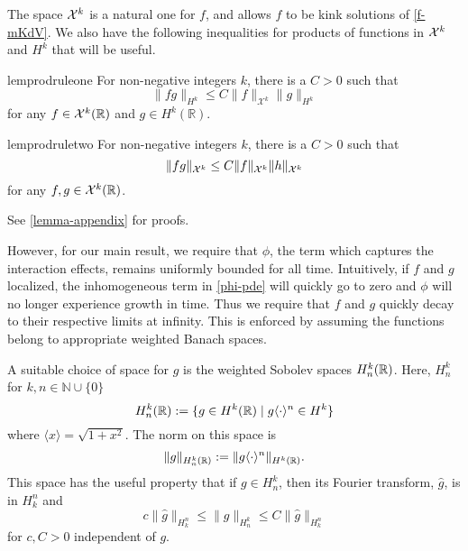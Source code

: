 The space \(\mathcal{X}^k\) is a natural one for \(f\), and allows \(f\) to be kink solutions of \cref{f-mKdV}. We also have the following inequalities for products of functions in \(\mathcal{X}^k\) and \(H^k\) that will be useful. 

	
\begin{restatable}{lem}{prodruleone}
	\label{prod-rule-1-lem}
	For non-negative integers \(k\), there is a \(C>0\) such that
	\begin{equation}\label{prod_rule}
		\| fg \|_{H^k} \leq C \| f \|_{\mathcal X^k} \| g \|_{H^k}
	\end{equation}
	for any \(f\in \mathcal{X}^k(\mathbb R)\) and \(g \in H^k(\mathbb R)\).
\end{restatable}

\begin{restatable}{lem}{prodruletwo}
	\label{prod-rule-2-lem}
	For non-negative integers \(k\), there is a \(C>0\) such that
	\begin{equation}\label{prod_rule_2}
		\| fg \|_{\mathcal{X}^k} \leq C \| f \|_{\mathcal{X}^k} \| h \|_{\mathcal{X}^k}
	\end{equation}
	for any \(f,g\in \mathcal{X}^k(\mathbb R)\).
\end{restatable}
See \cref{lemma-appendix} for proofs.

However, for our main result, we require that \(\phi\), the term which captures the interaction effects, remains uniformly bounded for all time. Intuitively, if \(f\) and \(g\) localized, the inhomogeneous term in \cref{phi-pde} will quickly go to zero and \(\phi\) will no longer experience growth in time. Thus we require that \(f\) and \(g\) quickly decay to their respective limits at infinity. This is enforced by assuming the functions belong to appropriate weighted Banach spaces.

A suitable choice of space for \(g\) is the weighted Sobolev spaces \(H^k_n(\mathbb{R})\). Here, \(H^k_n\) for \(k,n\in\mathbb N\cup \{0\}\)
\begin{equation}
	H^k_n(\mathbb{R}) := \{ g\in H^k(\mathbb{R}) \mid   g\langle \cdot \rangle^n \in H^k \}
\end{equation}
where \(\langle x \rangle = \sqrt{1+x^2}\). The norm on this space is
\begin{equation}
	\| g \|_{H^k_n(\mathbb{R})} := \|  g \langle \cdot \rangle^n\|_{H^k(\mathbb{R})}.
\end{equation}
This space has the useful property that if \(g \in H^k_n\), then its Fourier transform, \(\hat g \), is in \(H^n_k\) and 
\begin{equation}
	c \| \hat g \|_{H^n_k} \leq \| g \|_{H^k_n} \leq C \| \hat g \|_{H^n_k}
\end{equation}
for \(c,C>0\) independent of \(g\).

